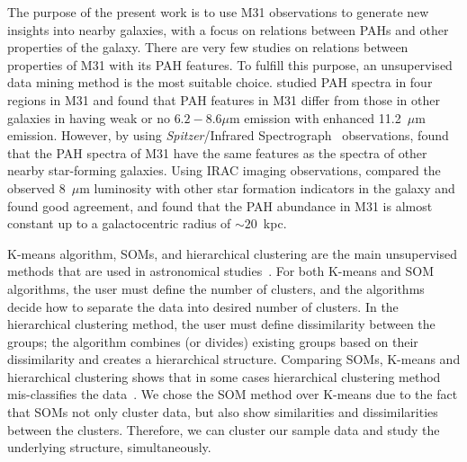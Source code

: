The purpose of the present work is to use M31 observations to generate new insights into nearby galaxies, with a focus on relations between PAHs and other properties of the galaxy.
There are very few studies on relations between properties of M31 with its PAH features.
To fulfill this purpose, an unsupervised data mining method is the most suitable choice.
\cite{Cesarsky98} studied PAH spectra in four regions in M31 and found that PAH features in M31 differ from those in other galaxies in having weak or no $6.2 - 8.6\mu$m emission with enhanced 11.2~$\mu$m emission. 
However, \cite{Dim15} by using {\it Spitzer}/Infrared Spectrograph~\citep[IRS,][]{Houck04b} observations, found that the PAH spectra of M31 have the same features as the spectra of other nearby star-forming galaxies.
Using IRAC imaging observations,\cite{Barmby06} compared the observed 8~$\mu$m luminosity with other star formation indicators in the galaxy and found good agreement, and \cite{Draine14} found that the PAH abundance in M31 is almost constant up to a galactocentric radius of $\sim 20$~kpc.

K-means algorithm, SOMs, and hierarchical clustering are the main unsupervised methods that are used in astronomical studies~\citep[e.g.][]{DAbrusco12, Aycha16}. %
For both K-means and SOM algorithms, the user must define the number of clusters, and the algorithms decide how to separate the data into desired number of clusters.
In the hierarchical clustering method, the user must define dissimilarity between the groups; the algorithm combines (or divides) existing groups based on their dissimilarity and creates a hierarchical structure. 
Comparing SOMs, K-means and hierarchical clustering shows that in some cases hierarchical clustering method mis-classifies the data~\citep[][and references therein]{Mangiameli96}.
We chose the SOM method over K-means due to the fact that SOMs not only cluster data, but also show similarities and dissimilarities between the clusters.
Therefore, we can cluster our sample data and study the underlying structure, simultaneously.

